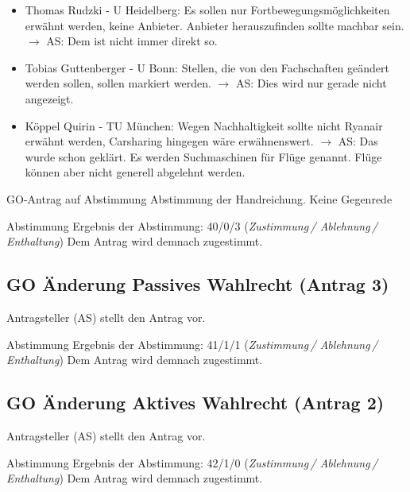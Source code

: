    \begin{itemize}
      \item Thomas Rudzki - U Heidelberg: Es sollen nur Fortbewegungsmöglichkeiten erwähnt werden, keine Anbieter. Anbieter herauszufinden sollte machbar sein. $\rightarrow$ AS: Dem ist nicht immer direkt so.
      \item Tobias Guttenberger - U Bonn: Stellen, die von den Fachschaften geändert werden sollen, sollen markiert werden.
        $\rightarrow$ AS: Dies wird nur gerade nicht angezeigt.
      \item Köppel Quirin - TU München: Wegen Nachhaltigkeit sollte nicht Ryanair erwähnt werden, Carsharing hingegen wäre erwähnenswert.
        $\rightarrow$ AS: Das wurde schon geklärt. Es werden Suchmaschinen für Flüge genannt. Flüge können aber nicht generell abgelehnt werden.
    \end{itemize}

    \begin{danger}{GO-Antrag auf Abstimmung}
      Abstimmung der Handreichung. Keine Gegenrede
    \end{danger}

    \begin{success}{Abstimmung}
      Ergebnis der Abstimmung: 40/0/3 (\textit{Zustimmung\,/ Ablehnung\,/ Enthaltung})
      Dem Antrag wird demnach zugestimmt.
    \end{success}

  \subsection*{GO Änderung Passives Wahlrecht (Antrag 3)}
    Antragsteller (AS) stellt den Antrag vor.

    \begin{success}{Abstimmung}
      Ergebnis der Abstimmung: 41/1/1 (\textit{Zustimmung\,/ Ablehnung\,/ Enthaltung})
      Dem Antrag wird demnach zugestimmt.
    \end{success}

  \subsection*{GO Änderung Aktives Wahlrecht (Antrag 2)}
    Antragsteller (AS) stellt den Antrag vor.

    \begin{success}{Abstimmung}
      Ergebnis der Abstimmung: 42/1/0 (\textit{Zustimmung\,/ Ablehnung\,/ Enthaltung})
      Dem Antrag wird demnach zugestimmt.
    \end{success}

